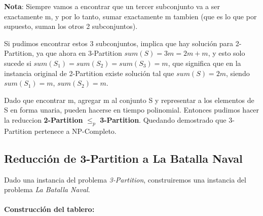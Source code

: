 \textbf{Nota}: Siempre vamos a encontrar que un tercer subconjunto va a ser exactamente m, y por lo tanto, sumar exactamente m tambien (que es lo que por supuesto, suman los otros 2 subconjuntos).

Si pudimos encontrar estos 3 subconjuntos, implica que hay solución para 2-Partition, ya que ahora en 3-Partition $sum(S) = 3m = 2m + m$, y esto solo sucede si $sum(S_1) = sum(S_2) = sum(S_3) = m$, que significa que en la instancia original de 2-Partition existe solución tal que $sum(S) = 2m$, siendo $sum(S_1) = m$, $sum(S_2) = m$.

Dado que encontrar m, agregar m al conjunto S y representar a los elementos de S en forma unaria, pueden hacerse en tiempo polinomial. Entonces pudimos hacer la reduccion \textbf{2-Partition} $\leq_p$ \textbf{3-Partition}. Quedando demostrado que 3-Partition pertenece a NP-Completo.


\subsection*{Reducción de 3-Partition a La Batalla Naval}


Dado una instancia del problema \textit{3-Partition}, construiremos una instancia del problema \textit{La Batalla Naval}.

\paragraph{Construcción del tablero:}

